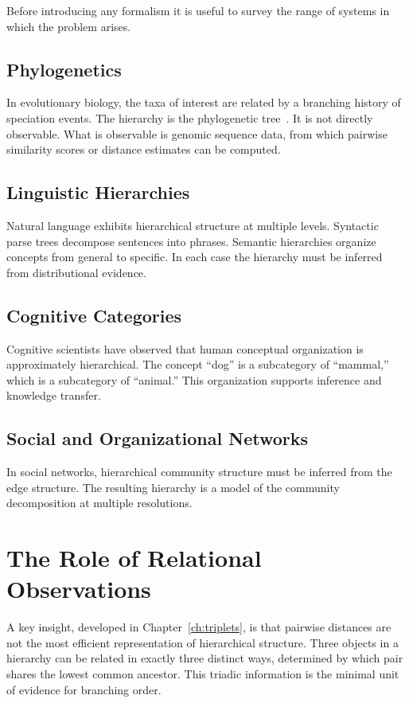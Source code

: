 Before introducing any formalism it is useful to survey the range of systems in which the problem arises.

\subsection{Phylogenetics}

In evolutionary biology, the taxa of interest are related by a branching history of speciation events. The hierarchy is the phylogenetic tree~\cite{Semple2003,Saitou1987}. It is not directly observable. What is observable is genomic sequence data, from which pairwise similarity scores or distance estimates can be computed.

\subsection{Linguistic Hierarchies}

Natural language exhibits hierarchical structure at multiple levels. Syntactic parse trees decompose sentences into phrases. Semantic hierarchies organize concepts from general to specific. In each case the hierarchy must be inferred from distributional evidence.

\subsection{Cognitive Categories}

Cognitive scientists have observed that human conceptual organization is approximately hierarchical. The concept ``dog'' is a subcategory of ``mammal,'' which is a subcategory of ``animal.'' This organization supports inference and knowledge transfer.

\subsection{Social and Organizational Networks}

In social networks, hierarchical community structure must be inferred from the edge structure. The resulting hierarchy is a model of the community decomposition at multiple resolutions.

\section{The Role of Relational Observations}

A key insight, developed in Chapter~\ref{ch:triplets}, is that pairwise distances are not the most efficient representation of hierarchical structure. Three objects in a hierarchy can be related in exactly three distinct ways, determined by which pair shares the lowest common ancestor. This triadic information is the minimal unit of evidence for branching order.

